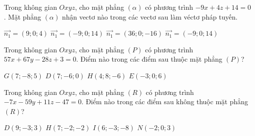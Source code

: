 \documentclass[12pt,a4paper]{article}
\begin{document}
\begin{ex}
 Trong không gian ${Oxyz}$, cho mặt phẳng ${(\alpha)}$ có phương trình $- 9 x + 4 z + 14=0$. Mặt phẳng ${(\alpha)}$ nhận vectơ nào trong các vectơ sau làm véctơ pháp tuyến.
 
\choice
{ $\overrightarrow{n_1}=(9;0;4)$ }
   { $\overrightarrow{n_1}=(-9;0;14)$ }
     { \True $\overrightarrow{n_1}=(36;0;-16)$ }
    { $\overrightarrow{n_1}=(-9;0;14)$ }
\end{ex}

\begin{ex}
 Trong không gian ${Oxyz}$, cho mặt phẳng ${(P)}$ có phương trình $57 x + 67 y - 28 z + 3=0$. Điểm nào trong các điểm sau thuộc mặt phẳng ${(P)}$?
 
\choice
{ $G(7;-8;5)$ }
   { \True $D(7;-6;0)$ }
     { $H(4;8;-6)$ }
    { $E(-3;0;6)$ }
\end{ex}

\begin{ex}
 Trong không gian ${Oxyz}$, cho mặt phẳng ${(R)}$ có phương trình $- 7 x - 59 y + 11 z - 47=0$. Điểm nào trong các điểm sau không thuộc mặt phẳng ${(R)}$?
 
\choice
{ \True $D(9;-3;3)$ }
   { $H(7;-2;-2)$ }
     { $I(6;-3;-8)$ }
    { $N(-2;0;3)$ }
\end{ex}
\end{document}

